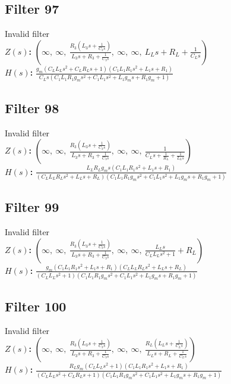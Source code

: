 \documentclass{article}
\begin{document}
\subsection*{Filter 97}
Invalid filter \\ 
\textbf{$Z(s)$:} $\left( \infty, \  \infty, \  \frac{R_{3} \left(L_{3} s + \frac{1}{C_{3} s}\right)}{L_{3} s + R_{3} + \frac{1}{C_{3} s}}, \  \infty, \  \infty, \  L_{L} s + R_{L} + \frac{1}{C_{L} s}\right)$ \\ 
\textbf{$H(s)$:} $\frac{g_{m} \left(C_{L} L_{L} s^{2} + C_{L} R_{L} s + 1\right) \left(C_{1} L_{1} R_{1} s^{2} + L_{1} s + R_{1}\right)}{C_{L} s \left(C_{1} L_{1} R_{1} g_{m} s^{2} + C_{1} L_{1} s^{2} + L_{1} g_{m} s + R_{1} g_{m} + 1\right)}$ \\ 
\subsection*{Filter 98}
Invalid filter \\ 
\textbf{$Z(s)$:} $\left( \infty, \  \infty, \  \frac{R_{3} \left(L_{3} s + \frac{1}{C_{3} s}\right)}{L_{3} s + R_{3} + \frac{1}{C_{3} s}}, \  \infty, \  \infty, \  \frac{1}{C_{L} s + \frac{1}{R_{L}} + \frac{1}{L_{L} s}}\right)$ \\ 
\textbf{$H(s)$:} $\frac{L_{L} R_{L} g_{m} s \left(C_{1} L_{1} R_{1} s^{2} + L_{1} s + R_{1}\right)}{\left(C_{L} L_{L} R_{L} s^{2} + L_{L} s + R_{L}\right) \left(C_{1} L_{1} R_{1} g_{m} s^{2} + C_{1} L_{1} s^{2} + L_{1} g_{m} s + R_{1} g_{m} + 1\right)}$ \\ 
\subsection*{Filter 99}
Invalid filter \\ 
\textbf{$Z(s)$:} $\left( \infty, \  \infty, \  \frac{R_{3} \left(L_{3} s + \frac{1}{C_{3} s}\right)}{L_{3} s + R_{3} + \frac{1}{C_{3} s}}, \  \infty, \  \infty, \  \frac{L_{L} s}{C_{L} L_{L} s^{2} + 1} + R_{L}\right)$ \\ 
\textbf{$H(s)$:} $\frac{g_{m} \left(C_{1} L_{1} R_{1} s^{2} + L_{1} s + R_{1}\right) \left(C_{L} L_{L} R_{L} s^{2} + L_{L} s + R_{L}\right)}{\left(C_{L} L_{L} s^{2} + 1\right) \left(C_{1} L_{1} R_{1} g_{m} s^{2} + C_{1} L_{1} s^{2} + L_{1} g_{m} s + R_{1} g_{m} + 1\right)}$ \\ 
\subsection*{Filter 100}
Invalid filter \\ 
\textbf{$Z(s)$:} $\left( \infty, \  \infty, \  \frac{R_{3} \left(L_{3} s + \frac{1}{C_{3} s}\right)}{L_{3} s + R_{3} + \frac{1}{C_{3} s}}, \  \infty, \  \infty, \  \frac{R_{L} \left(L_{L} s + \frac{1}{C_{L} s}\right)}{L_{L} s + R_{L} + \frac{1}{C_{L} s}}\right)$ \\ 
\textbf{$H(s)$:} $\frac{R_{L} g_{m} \left(C_{L} L_{L} s^{2} + 1\right) \left(C_{1} L_{1} R_{1} s^{2} + L_{1} s + R_{1}\right)}{\left(C_{L} L_{L} s^{2} + C_{L} R_{L} s + 1\right) \left(C_{1} L_{1} R_{1} g_{m} s^{2} + C_{1} L_{1} s^{2} + L_{1} g_{m} s + R_{1} g_{m} + 1\right)}$ \\ 
\end{document}
